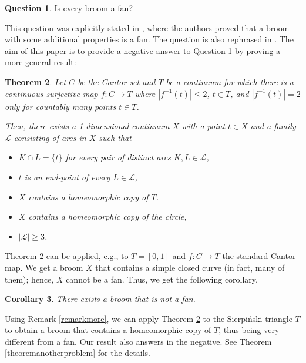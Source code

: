 \documentclass[12pt]{article}
\newtheorem{theorem}{Theorem} %
\newtheorem{corollary}[theorem]{Corollary}
\theoremstyle{definition}
\newtheorem{question}[theorem]{Question}
\theoremstyle{remark}
\begin{document}
\begin{question}\label{questionmain}
Is every broom a fan?
\end{question}

This question was explicitly stated in \cite[Problem 3.4]{phans}, where the authors proved that a broom with some additional properties is a fan. The question is also rephrased in \cite{Lipham}.
The aim of this paper is to provide a negative answer to Question \ref{questionmain} by proving a more general result:

\begin{theorem}\label{mainthm}
Let $C$ be the Cantor set and $T$ be a continuum for which there is a continuous surjective map $f:C\to T$ where $|f^{-1}(t)|\leq2$, $t\in T$, and $|f^{-1}(t)|=2$ only for countably many points $t\in T$.

Then, there exists a 1-dimensional continuum $X$ with a point $t\in X$ 
and a family $\mathcal L$ consisting of arcs in $X$ such that 
\begin{itemize}[noitemsep]
 \item $K\cap L=\{t\}$ for every pair of distinct arcs $K,L\in\mathcal L$,
 \item $t$ is an end-point of every $L\in\mathcal L$,
 \item $X$ contains a homeomorphic copy of $T$.
 \item $X$ contains a homeomorphic copy of the circle,
 \item $|\mathcal L|\geq 3$.
\end{itemize}
\end{theorem}

Theorem \ref{mainthm} can be applied, e.g., to $T=[0,1]$ and $f:C\to T$ the standard Cantor map. We get a broom $X$ that contains a simple closed curve (in fact, many of them); hence, $X$ cannot be a fan. Thus, we get the following corollary.

\begin{corollary}
There exists a broom that is not a fan.
\end{corollary}

Using Remark \ref{remarkmore}, we can apply Theorem \ref{mainthm} to the Sierpiński triangle $T$ to obtain a broom that contains a homeomorphic copy of $T$, thus being very different from a fan.
Our result also answers \cite[Problem 4.17]{phans} in the negative. See Theorem \ref{theoremanotherproblem} for the details.
\end{document}
